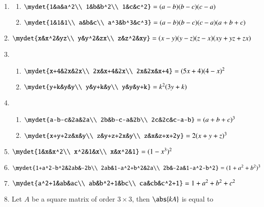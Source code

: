 \documentclass{article}
\theoremstyle{remark}
\begin{document}
\begin{enumerate}[resume]
\item \label{prob:8}
\begin{enumerate}[label=(\roman*)]
\item $\mydet{1&a&a^2\\ 1&b&b^2\\ 1&c&c^2} = (a-b) (b-c) (c-a)$
\item $\mydet{1&1&1\\ a&b&c\\ a^3&b^3&c^3} = (a-b) (b-c) (c-a) (a+b+c)$
\end{enumerate}
\item $\mydet{x&x^2&yz\\  y&y^2&zx\\ z&z^2&xy} = (x-y) (y-z) (z-x) (xy+yz+zx)$
\item
\begin{enumerate}[label=(\roman*)]
\item $\mydet{x+4&2x&2x\\ 2x&x+4&2x\\ 2x&2x&x+4} = (5x+4)(4-x)^2$
\item $\mydet{y+k&y&y\\ y&y+k&y\\ y&y&y+k}=k^2(3y+k)$
\end{enumerate}
\item
\begin{enumerate}[label=(\roman*)]
\item $\mydet{a-b-c&2a&2a\\ 2b&b-c-a&2b\\ 2c&2c&c-a-b} = (a+b+c)^3$  
\item $\mydet{x+y+2z&x&y\\ z&y+z+2x&y\\ z&x&z+x+2y}= 2(x+y+z)^3$
\end{enumerate}
\item $\mydet{1&x&x^2\\ x^2&1&x\\ x&x^2&1} = (1-x^3)^2$
\item $\mydet{1+a^2-b^2&2ab&-2b\\ 2ab&1-a^2+b^2&2a\\ 2b&-2a&1-a^2-b^2} = (1+a^2+b^2)^3$
\item $\mydet{a^2+1&ab&ac\\ ab&b^2+1&bc\\ ca&cb&c^2+1} = 1+a^2+b^2+c^2$\label{prob:14}
\item Let $A$ be a square matrix of order $3 \times 3$, then $\abs{kA}$ is equal to 

\end{enumerate}
\end{document}
